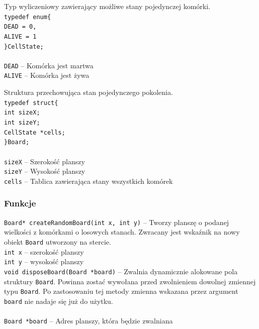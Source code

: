 \documentclass{article}
\begin{document}
Typ wyliczeniowy zawierający możliwe stany pojedynczej komórki. \\
\texttt{typedef enum\{\\
	 \hspace*{10mm}DEAD = 0,\\
	 \hspace*{10mm}ALIVE = 1\\
\}CellState;\\} \\
\texttt{DEAD} -- Komórka jest martwa \\
\texttt{ALIVE} -- Komórka jest żywa

\vspace*{10mm}

\noindent{}Struktura przechowująca stan pojedynczego pokolenia. \\
\texttt{typedef struct\{\\
	 \hspace*{10mm}int sizeX;\\
	 \hspace*{10mm}int sizeY;\\
	 \hspace*{10mm}CellState *cells;\\
\}Board;\\} \\
\texttt{sizeX} -- Szerokość planszy \\
\texttt{sizeY} -- Wysokość planszy \\
\texttt{cells} -- Tablica zawierająca stany wszystkich komórek

\subsubsection{Funkcje}

\texttt{Board* createRandomBoard(int x, int y)} -- Tworzy planszę o podanej wielkości z komórkami o losowych stanach. Zwracany jest wskaźnik na nowy obiekt \texttt{Board} utworzony na stercie. \\
\hspace*{10mm}\texttt{int x} -- szerokość planszy\\
\hspace*{10mm}\texttt{int y} -- wysokość planszy\\

\vspace*{8mm}
\noindent{}\texttt{void disposeBoard(Board *board)} -- Zwalnia dynamicznie alokowane pola struktury \texttt{Board}. Powinna zostać wywołana przed zwolnieniem dowolnej zmiennej typu \texttt{Board}. Po zastosowaniu tej metody zmienna wskazana przez argument \texttt{board} nie nadaje się już do użytku. \\ \\
\hspace*{10mm}\texttt{Board *board} -- Adres planszy, która będzie zwalniana\\
\end{document}
